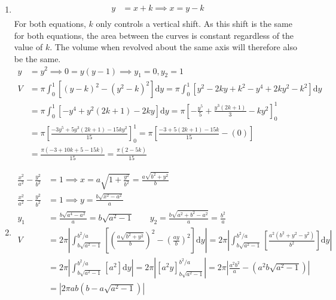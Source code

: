 \documentclass[12pt, A4]{report}
\renewcommand{\d}{\text{d}}
\begin{document}
\begin{enumerate}
				\item
					\begin{align*}
						y &= x + k
								\implies x = y - k \\
					\end{align*}
					For both equations, $k$ only controls a vertical shift. As this shift is the same for both equations, the area between the curves is constant regardless of the value of $k$. The volume when revolved about the same axis will therefore also be the same.
					\begin{align*}
						y &= y^2 
								\implies 0 = y(y - 1) 
								\implies y_1 = 0, y_2 = 1 \tag{$k = 0$} \\
						V &= \pi\int_0^1\left[(y - k)^2 - (y^2 - k)^2\right]\d y
								= \pi\int_0^1\left[y^2 - 2ky + k^2 - y^4 + 2ky^2 - k^2\right]\d y \\
							&= \pi\int_0^1\left[-y^4 + y^2(2k + 1) - 2ky\right]\d y
								= \pi\left[-\frac{y^5}{5} + \frac{y^3(2k + 1)}{3} - ky^2\right]_0^1 \\
							&= \pi\left[\frac{-3y^5 + 5y^3(2k + 1) - 15ky^2}{15}\right]_0^1
								= \pi\left[\frac{-3 + 5(2k + 1) - 15k}{15} - (0)\right] \\
							&= \frac{\pi(-3 + 10k + 5 - 15k)}{15} 
								= \frac{\pi(2 - 5k)}{15}
					\end{align*}
				\item
					\begin{align*}
						\frac{x^2}{a^2} - \frac{y^2}{b^2} &= 1 
									\implies x = a\sqrt{1 + \frac{y^2}{b^2}}
										= \frac{a\sqrt{b^2 + y^2}}{b} \\
							\frac{x^2}{a^2} - \frac{y^2}{b^2} &= 1 \implies y 
									= \frac{b\sqrt{x^2 - a^2}}{a} \\
							y_1 &= \frac{b\sqrt{a^4 - a^2}}{a} 
									= b\sqrt{a^2 - 1} \qquad 
								y_2 = \frac{b\sqrt{a^2 + b^2 - a^2}}{a} 
									= \frac{b^2}{a} \\
						V &= 2\pi\left|\int_{b\sqrt{a^2 - 1}}^{b^2/a}\left[\left(\frac{a\sqrt{b^2 + y^2}}{b}\right)^2 - \left(\frac{ay}{b}\right)^2\right]\d y\right|
								= 2\pi\left|\int_{b\sqrt{a^2 - 1}}^{b^2/a}\left[\frac{a^2(b^2 + y^2 - y^2)}{b^2}\right]\d y\right| \\
							&= 2\pi\left|\int_{b\sqrt{a^2 - 1}}^{b^2/a}\left[a^2\right]\d y\right|
								= 2\pi\left|\left[a^2y\right]_{b\sqrt{a^2 - 1}}^{b^2/a}\right| 
								= 2\pi\left|\frac{a^2b^2}{a} - \left(a^2b\sqrt{a^2 - 1}\right)\right| \\
							&= \left|2\pi ab\left(b - a\sqrt{a^2 - 1}\right)\right|

\end{align*}
\end{enumerate}
\end{document}
